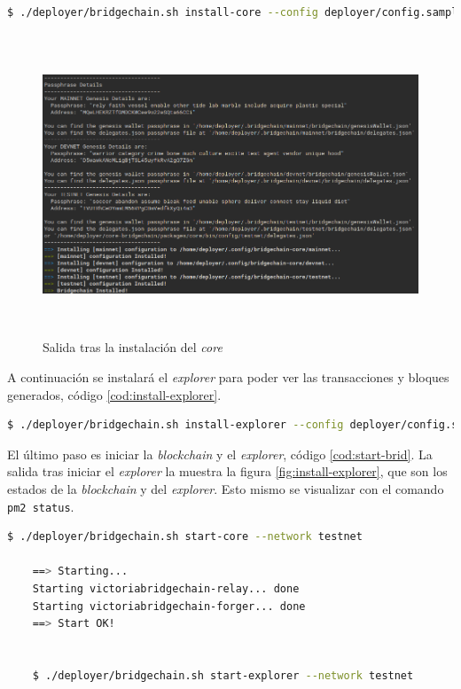 \begin{lstlisting}[language=Bash,caption=Instalación \textit{blockchain}. Parte XI, label=cod:install-bridgechain, style=Consola]
	$ ./deployer/bridgechain.sh install-core --config deployer/config.sample.json --autoinstall-deps --non-interactive
\end{lstlisting}

\begin{figure}[H]
	\centering
	\includegraphics[width=15cm,height=9cm]{figuras/Instalacion_bridgechain.png}
	\caption{Salida tras la instalación del \textit{core}}
	\label{fig:install-bridge}
\end{figure}

A continuación se instalará el \textit{explorer} para poder ver las transacciones y bloques generados, código \ref{cod:install-explorer}.\\

\begin{lstlisting}[language=Bash,caption=Instalación \textit{blockchain}. Parte XII, label=cod:install-explorer, style=Consola]
	$ ./deployer/bridgechain.sh install-explorer --config deployer/config.sample.json --skip-deps --non-interactive
\end{lstlisting}


El último paso es iniciar la \textit{blockchain} y el \textit{explorer}, código \ref{cod:start-brid}. La salida tras iniciar el \textit{explorer} la muestra la figura \ref{fig:install-explorer}, que son los estados de la \textit{blockchain} y del \textit{explorer}. Esto mismo se visualizar con el comando \texttt{pm2 status}.\\

\begin{lstlisting}[language=Bash,caption=Instalación \textit{blockchain}. Parte XIII, label=cod:start-brid, style=Consola]
	$ ./deployer/bridgechain.sh start-core --network testnet

	==> Starting...
	Starting victoriabridgechain-relay... done
	Starting victoriabridgechain-forger... done
	==> Start OK!


	$ ./deployer/bridgechain.sh start-explorer --network testnet
\end{lstlisting}


